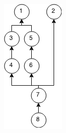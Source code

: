 \begin{figure}[h!]
    \centering
    \begin{subfigure}[b]{0.16\textwidth}
        \includegraphics[width=\textwidth]{images/deps.png}

\end{subfigure}
\end{figure}
